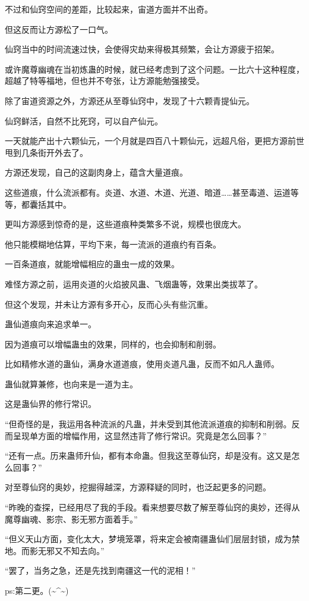 \begin{this_body}
不过和仙窍空间的差距，比较起来，宙道方面并不出奇。

但这反而让方源松了一口气。

仙窍当中的时间流速过快，会使得灾劫来得极其频繁，会让方源疲于招架。

或许魔尊幽魂在当初炼蛊的时候，就已经考虑到了这个问题。一比六十这种程度，超越了特等福地，但也并不夸张，让方源能勉强接受。

除了宙道资源之外，方源还从至尊仙窍中，发现了十六颗青提仙元。

仙窍鲜活，自然不比死窍，可以自产仙元。

一天就能产出十六颗仙元，一个月就是四百八十颗仙元，远超凡俗，更把方源前世甩到几条街开外去了。

方源还发现，自己的这副肉身上，蕴含大量道痕。

这些道痕，什么流派都有。炎道、水道、木道、光道、暗道……甚至毒道、运道等等，都囊括其中。

更叫方源感到惊奇的是，这些道痕种类繁多不说，规模也很庞大。

他只能模糊地估算，平均下来，每一流派的道痕约有百条。

一百条道痕，就能增幅相应的蛊虫一成的效果。

难怪方源之前，运用炎道的火焰披风蛊、飞烟蛊等，效果出类拔萃了。

但这个发现，并未让方源有多开心，反而心头有些沉重。

蛊仙道痕向来追求单一。

因为道痕可以增幅蛊虫的效果，同样的，也会抑制和削弱。

比如精修水道的蛊仙，满身水道道痕，使用炎道凡蛊，反而不如凡人蛊师。

蛊仙就算兼修，也向来是一道为主。

这是蛊仙界的修行常识。

“但奇怪的是，我运用各种流派的凡蛊，并未受到其他流派道痕的抑制和削弱。反而呈现单方面的增幅作用，这显然违背了修行常识。究竟是怎么回事？”

“还有一点。历来蛊师升仙，都有本命蛊。但我这至尊仙窍，却是没有。这又是怎么回事？”

对至尊仙窍的奥妙，挖掘得越深，方源释疑的同时，也泛起更多的问题。

“昨晚的查探，已经用尽了我的手段。看来想要尽数了解至尊仙窍的奥妙，还得从魔尊幽魂、影宗、影无邪方面着手。”

“但义天山方面，变化太大，梦境笼罩，将来定会被南疆蛊仙们层层封锁，成为禁地。而影无邪又不知去向。”

“罢了，当务之急，还是先找到南疆这一代的泥相！”

ps:第二更。(\~{}\^{}\~{})

\end{this_body}

